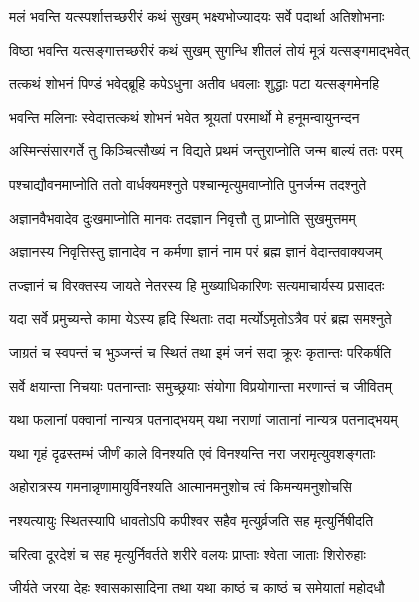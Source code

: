 \twolineshloka
{मलं भवन्ति यत्स्पर्शात्तच्छरीरं कथं सुखम्}
{भक्ष्यभोज्यादयः सर्वे पदार्था अतिशोभनाः}%

\twolineshloka
{विष्ठा भवन्ति यत्सङ्गात्तच्छरीरं कथं सुखम्}
{सुगन्धि शीतलं तोयं मूत्रं यत्सङ्गमाद्भवेत्}%

\twolineshloka
{तत्कथं शोभनं पिण्डं भवेद्ब्रूहि कपेऽधुना}
{अतीव धवलाः शुद्धाः पटा यत्सङ्गमेनहि}%

\twolineshloka
{भवन्ति मलिनाः स्वेदात्तत्कथं शोभनं भवेत}
{श्रूयतां परमार्थो मे हनूमन्वायुनन्दन}%

\twolineshloka
{अस्मिन्संसारगर्ते तु किञ्चित्सौख्यं न विद्यते}
{प्रथमं जन्तुराप्नोति जन्म बाल्यं ततः परम्}%

\twolineshloka
{पश्चाद्यौवनमाप्नोति ततो वार्धक्यमश्नुते}
{पश्चान्मृत्युमवाप्नोति पुनर्जन्म तदश्नुते}%

\twolineshloka
{अज्ञानवैभवादेव दुःखमाप्नोति मानवः}
{तदज्ञान निवृत्तौ तु प्राप्नोति सुखमुत्तमम्}%

\twolineshloka
{अज्ञानस्य निवृत्तिस्तु ज्ञानादेव न कर्मणा}
{ज्ञानं नाम परं ब्रह्म ज्ञानं वेदान्तवाक्यजम्}%

\twolineshloka
{तज्ज्ञानं च विरक्तस्य जायते नेतरस्य हि}
{मुख्याधिकारिणः सत्यमाचार्यस्य प्रसादतः}%

\twolineshloka
{यदा सर्वे प्रमुच्यन्ते कामा येऽस्य हृदि स्थिताः}
{तदा मर्त्योऽमृतोऽत्रैव परं ब्रह्म समश्नुते}%

\twolineshloka
{जाग्रतं च स्वपन्तं च भुञ्जन्तं च स्थितं तथा}
{इमं जनं सदा क्रूरः कृतान्तः परिकर्षति}%

\twolineshloka
{सर्वे क्षयान्ता निचयाः पतनान्ताः समुच्छ्रयाः}
{संयोगा विप्रयोगान्ता मरणान्तं च जीवितम्}%

\twolineshloka
{यथा फलानां पक्वानां नान्यत्र पतनाद्भयम्}
{यथा नराणां जातानां नान्यत्र पतनाद्भयम्}%

\twolineshloka
{यथा गृहं दृढस्तम्भं जीर्णं काले विनश्यति}
{एवं विनश्यन्ति नरा जरामृत्युवशङ्गताः}%

\twolineshloka
{अहोरात्रस्य गमनान्नृणामायुर्विनश्यति}
{आत्मानमनुशोच त्वं किमन्यमनुशोचसि}%

\twolineshloka
{नश्यत्यायुः स्थितस्यापि धावतोऽपि कपीश्वर}
{सहैव मृत्युर्व्रजति सह मृत्युर्निषीदति}%

\twolineshloka
{चरित्वा दूरदेशं च सह मृत्युर्निवर्तते}
{शरीरे वलयः प्राप्ताः श्वेता जाताः शिरोरुहाः}%

\twolineshloka
{जीर्यते जरया देहः श्वासकासादिना तथा}
{यथा काष्ठं च काष्ठं च समेयातां महोदधौ}%

